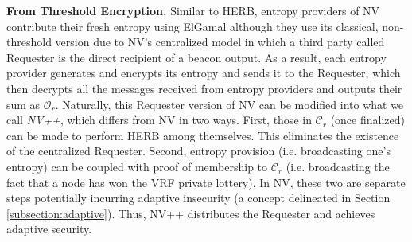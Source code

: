 \documentclass[conference]{IEEEtran}
\theoremstyle{definition}
\theoremstyle{remark}
\begin{document}
\noindent\textbf{From Threshold Encryption.} Similar to HERB, entropy providers of NV \cite{nguyen2019scalable} contribute their fresh entropy using ElGamal although they use its classical, non-threshold version due to NV's centralized model in which a third party called Requester is the direct recipient of a beacon output. As a result, each entropy provider generates and encrypts its entropy and sends it to the Requester, which then decrypts all the messages received from entropy providers and outputs their sum as $\mathcal{O}_r$. Naturally, this Requester version of NV can be modified into what we call \textit{NV++}, which differs from NV in two ways. First, those in $\mathcal{C}_r$ (once finalized) can be made to perform HERB among themselves. This eliminates the existence of the centralized Requester. Second, entropy provision (i.e. broadcasting one's entropy) can be coupled with proof of membership to $\mathcal{C}_r$ (i.e. broadcasting the fact that a node has won the VRF private lottery). In NV, these two are separate steps potentially incurring adaptive insecurity (a concept delineated in Section \ref{subsection:adaptive}). Thus, NV++ distributes the Requester and achieves adaptive security.
\end{document}
